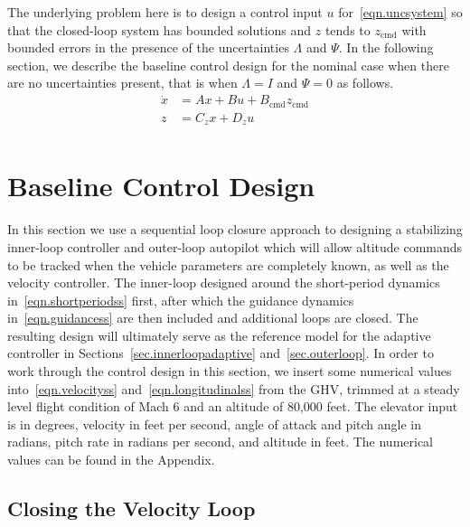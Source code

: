 \documentclass[]{../sty/aiaa-tc}
\theoremstyle{examplestyle}
\begin{document}
  The underlying problem here is to design a control input $u$ for\ \eqref{eqn.uncsystem} so that the closed-loop system has bounded solutions and $z$ tends to $z_{\text{cmd}}$ with bounded errors in the presence of the uncertainties $\Lambda$ and $\Psi$.
  In the following section, we describe the baseline control design for the nominal case when there are no uncertainties present, that is when $\Lambda=I$ and $\Psi=0$ as follows.
  \begin{equation}
    \label{eqn.cersystem}
    \begin{split}
      \dot{x} &= Ax+Bu+B_{\text{cmd}}z_{\text{cmd}} \\
      z &= C_{z}x + D_{z}u \\
    \end{split}
  \end{equation}

  \section{Baseline Control Design}\label{sec.baseline}

  In this section we use a sequential loop closure approach to designing a stabilizing inner-loop controller and outer-loop autopilot which will allow altitude commands to be tracked when the vehicle parameters are completely known, as well as the velocity controller.
  The inner-loop designed around the short-period dynamics in\ \eqref{eqn.shortperiodss} first, after which the guidance dynamics in\ \eqref{eqn.guidancess} are then included and additional loops are closed.
  The resulting design will ultimately serve as the reference model for the adaptive controller in Sections~\ref{sec.innerloopadaptive} and~\ref{sec.outerloop}.
  In order to work through the control design in this section, we insert some numerical values into\ \eqref{eqn.velocityss} and\ \eqref{eqn.longitudinalss} from the GHV, trimmed at a steady level flight condition of Mach 6 and an altitude of 80,000 feet.
  The elevator input is in degrees, velocity in feet per second, angle of attack and pitch angle in radians, pitch rate in radians per second, and altitude in feet.
  The numerical values can be found in the Appendix.

  \subsection{Closing the Velocity Loop}\label{subsec.velocity}
\end{document}
